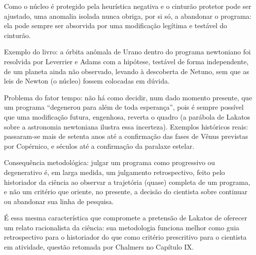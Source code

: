 \documentclass[10pt]{extarticle}
\newcommand{\resposta}[1]{\par\smallskip\noindent #1}
\begin{document}
\begin{questoes}
\resposta{
\begin{topicos}
\item Como o núcleo é protegido pela heurística negativa e o cinturão protetor pode ser ajustado, uma anomalia isolada nunca obriga, por si só, a abandonar o programa: ela pode sempre ser absorvida por uma modificação legítima e testável do cinturão.
\item Exemplo do livro: a órbita anômala de Urano dentro do programa newtoniano foi resolvida por Leverrier e Adams com a hipótese, testável de forma independente, de um planeta ainda não observado, levando à descoberta de Netuno, sem que as leis de Newton (o núcleo) fossem colocadas em dúvida.
\item Problema do fator tempo: não há como decidir, num dado momento presente, que um programa \enquote{degenerou para além de toda esperança}, pois é sempre possível que uma modificação futura, engenhosa, reverta o quadro (a parábola de Lakatos sobre a astronomia newtoniana ilustra essa incerteza). Exemplos históricos reais: passaram-se mais de setenta anos até a confirmação das fases de Vênus previstas por Copérnico, e séculos até a confirmação da paralaxe estelar.
\item Consequência metodológica: julgar um programa como progressivo ou degenerativo é, em larga medida, um julgamento retrospectivo, feito pelo historiador da ciência ao observar a trajetória (quase) completa de um programa, e não um critério que oriente, no presente, a decisão do cientista sobre continuar ou abandonar sua linha de pesquisa.
\item É essa mesma característica que compromete a pretensão de Lakatos de oferecer um relato racionalista da ciência: sua metodologia funciona melhor como guia retrospectivo para o historiador do que como critério prescritivo para o cientista em atividade, questão retomada por Chalmers no Capítulo IX.
\end{topicos}
}

\end{questoes}

\end{document}
